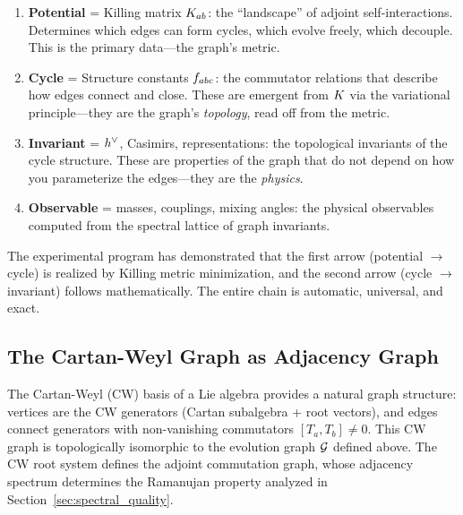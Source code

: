 \begin{enumerate}
    \item \textbf{Potential} = Killing matrix $K_{ab}$: the ``landscape'' of adjoint self-interactions. Determines which edges can form cycles, which evolve freely, which decouple. This is the primary data---the graph's metric.
    
    \item \textbf{Cycle} = Structure constants $f_{abc}$: the commutator relations that describe how edges connect and close. These are emergent from $K$ via the variational principle---they are the graph's \emph{topology}, read off from the metric.
    
    \item \textbf{Invariant} = $h^\vee$, Casimirs, representations: the topological invariants of the cycle structure. These are properties of the graph that do not depend on how you parameterize the edges---they are the \emph{physics}.
    
    \item \textbf{Observable} = masses, couplings, mixing angles: the physical observables computed from the spectral lattice of graph invariants.
\end{enumerate}

The experimental program has demonstrated that the first arrow (potential $\to$ cycle) is realized by Killing metric minimization, and the second arrow (cycle $\to$ invariant) follows mathematically. The entire chain is automatic, universal, and exact.

\subsection{The Cartan-Weyl Graph as Adjacency Graph}\label{sec:cartan_weyl_graph}

The Cartan-Weyl (CW) basis of a Lie algebra provides a natural graph structure: vertices are the CW generators (Cartan subalgebra + root vectors), and edges connect generators with non-vanishing commutators $[T_a, T_b] \neq 0$. This CW graph is topologically isomorphic to the evolution graph $\mathcal{G}$ defined above. The CW root system defines the adjoint commutation graph, whose adjacency spectrum determines the Ramanujan property analyzed in Section~\ref{sec:spectral_quality}.
